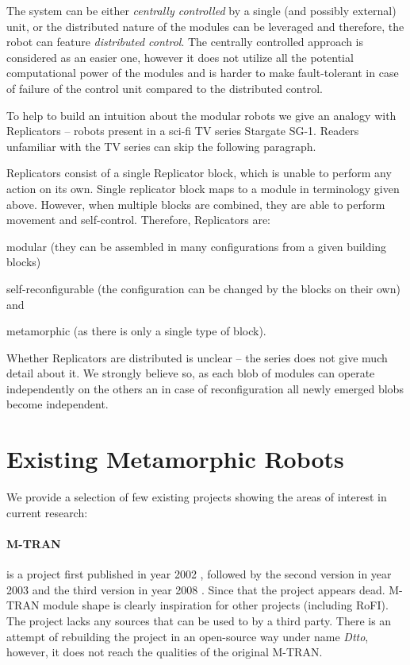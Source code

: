 The system can be either \emph{centrally controlled} by a single (and possibly
external) unit, or the distributed nature of the modules can be leveraged and
therefore, the robot can feature \emph{distributed control}. The centrally
controlled approach is considered as an easier one, however it does not utilize
all the potential computational power of the modules and is harder to make
fault-tolerant in case of failure of the control unit compared to the
distributed control.

To help to build an intuition about the modular robots we give an analogy with
Replicators -- robots present in a sci-fi TV series Stargate
SG-1\cite{wright_stargate_1997}. Readers unfamiliar with the TV series can skip
the following paragraph.

Replicators consist of a single Replicator block, which is unable to perform any
action on its own. Single replicator block maps to a module in terminology given
above. However, when multiple blocks are combined, they are able to perform
movement and self-control. Therefore, Replicators are:
\begin{enumerate*}
    \item modular (they can be assembled in many configurations from a given
    building blocks)
    \item self-reconfigurable (the configuration can be changed by the blocks on
    their own) and
    \item metamorphic (as there is only a single type of block).
\end{enumerate*}
Whether Replicators are distributed is unclear -- the series does not give much
detail about it. We strongly believe so, as each blob of modules can operate
independently on the others an in case of reconfiguration all newly emerged
blobs become independent.

\section{Existing Metamorphic Robots}

We provide a selection of few existing projects showing the areas of interest in
current research:

\paragraph{M-TRAN} is a project first published in year 2002
\cite{murata_m-tran:_2002}, followed by the second version in year 2003
\cite{haruhisa_kurokawa_m-tran_2003} and the third version in year 2008
\cite{kurokawa_distributed_2008}. Since that the project appears dead. M-TRAN
module shape is clearly inspiration for other projects (including RoFI). The
project lacks any sources that can be used to by a third party. There is an
attempt of rebuilding the project in an open-source way under name
\emph{Dtto}\cite{noauthor_dtto_nodate}, however, it does not reach the qualities
of the original M-TRAN.


